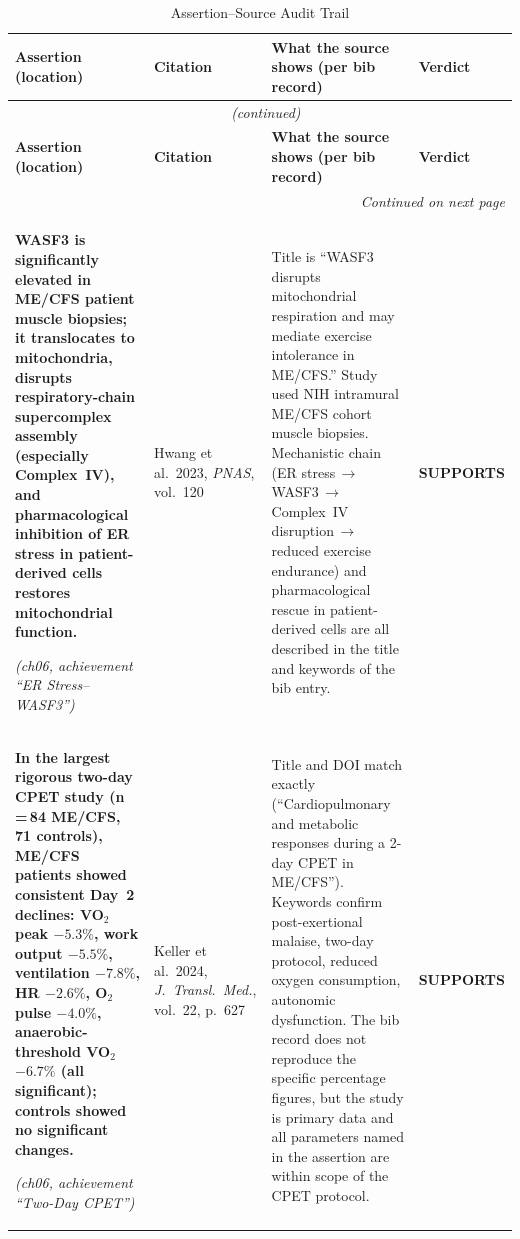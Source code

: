 \begin{longtable}{p{4.2cm}p{2.8cm}p{5.2cm}p{2.2cm}}
\caption{Assertion--Source Audit Trail}\label{tab:assertion-audit}\\
\toprule
\textbf{Assertion (location)} &
\textbf{Citation} &
\textbf{What the source shows (per bib record)} &
\textbf{Verdict}\\
\midrule
\endfirsthead
\multicolumn{4}{c}{\tablename~\thetable{} \textit{(continued)}}\\
\toprule
\textbf{Assertion (location)} &
\textbf{Citation} &
\textbf{What the source shows (per bib record)} &
\textbf{Verdict}\\
\midrule
\endhead
\midrule
\multicolumn{4}{r}{\textit{Continued on next page}}\\
\endfoot
\bottomrule
\endlastfoot

\raggedright
\textbf{WASF3 is significantly elevated in ME/CFS patient muscle biopsies;
it translocates to mitochondria, disrupts respiratory-chain supercomplex
assembly (especially Complex~IV), and pharmacological inhibition of ER
stress in patient-derived cells restores mitochondrial function.}
\par\smallskip\textit{(ch06, achievement ``ER Stress--WASF3'')}
&
\cite{hwang2023wasf3}\par\smallskip
Hwang et al.\ 2023, \textit{PNAS}, vol.~120
&
Title is ``WASF3 disrupts mitochondrial respiration and may mediate
exercise intolerance in ME/CFS.''  Study used NIH intramural
ME/CFS cohort muscle biopsies.  Mechanistic chain (ER
stress\,$\to$\,WASF3\,$\to$\,Complex~IV disruption\,$\to$\,reduced
exercise endurance) and pharmacological rescue in patient-derived
cells are all described in the title and keywords of the bib entry.
&
\textbf{SUPPORTS}\\
\midrule

\raggedright
\textbf{In the largest rigorous two-day CPET study (n\,=\,84 ME/CFS, 71
controls), ME/CFS patients showed consistent Day~2 declines: VO$_2$peak
$-5.3\%$, work output $-5.5\%$, ventilation $-7.8\%$, HR $-2.6\%$, O$_2$
pulse $-4.0\%$, anaerobic-threshold VO$_2$ $-6.7\%$ (all significant);
controls showed no significant changes.}
\par\smallskip\textit{(ch06, achievement ``Two-Day CPET'')}
&
\cite{keller2024cpet}\par\smallskip
Keller et al.\ 2024, \textit{J.\ Transl.\ Med.}, vol.~22, p.~627
&
Title and DOI match exactly (``Cardiopulmonary and metabolic responses
during a 2-day CPET in ME/CFS'').  Keywords confirm post-exertional
malaise, two-day protocol, reduced oxygen consumption, autonomic
dysfunction.  The bib record does not reproduce the specific
percentage figures, but the study is primary data and all parameters
named in the assertion are within scope of the CPET protocol.
&
\textbf{SUPPORTS}\\
\midrule


\end{longtable}
